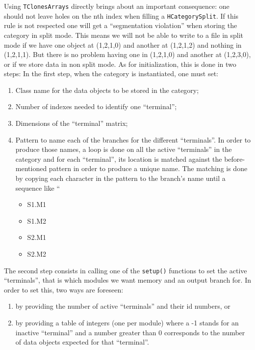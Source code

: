 Using \verb+TClonesArrays+ directly brings about an important consequence: 
one should not leave holes on the nth index when filling a \verb+HCategorySplit+. 
If this rule is not respected one will get a ``segmentation violation'' 
when storing the category in split mode. This means we will not be able to 
write to a file in split mode if we have one object at (1,2,1,0) and another 
at (1,2,1,2) and nothing in (1,2,1,1). But there is no problem having one in 
(1,2,1,0) and another at (1,2,3,0), or if we store data in non split mode.
As for initialization, this is done in two steps: In the first step, when the 
category is instantiated, one must set:
\begin{enumerate}
    \item Class name for the data objects to be stored in the category;
    \item Number of indexes needed to identify one ``terminal'';
    \item Dimensions of the ``terminal'' matrix;
    \item Pattern to name each of the branches for the different ``terminals''. In order to produce those names, a loop is done on all the active ``terminals'' in the category and for each ``terminal'', its location is matched against the before-mentioned pattern in order to produce a unique name. The matching is done by copying each character in the pattern to the branch's name until a sequence like ``%
     \begin{itemize}
       \item S1.M1
       \item S1.M2
       \item S2.M1
       \item S2.M2
     \end{itemize} 
\end{enumerate}
The second step consists in calling one of the \verb+setup()+ functions to 
set the active ``terminals'', that is which modules we want memory and an 
output branch for. In order to set this, two ways are foreseen: 
\begin{enumerate}
 \item by providing the number of active ``terminals'' and their id numbers, or 
 \item by providing a table of integers (one per module) where a -1 stands for an inactive ``terminal'' and a number greater than 0 corresponds to the number of data objects expected for that ``terminal''. 
\end{enumerate}

